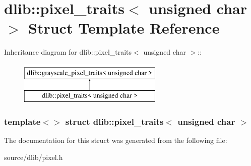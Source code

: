 \hypertarget{structdlib_1_1pixel__traits_3_01unsigned_01char_01_4}{
\section{dlib::pixel\_\-traits$<$ unsigned char $>$ Struct Template Reference}
\label{structdlib_1_1pixel__traits_3_01unsigned_01char_01_4}
}
Inheritance diagram for dlib::pixel\_\-traits$<$ unsigned char $>$::\begin{figure}[H]
\begin{center}
\leavevmode
\includegraphics[height=2cm]{structdlib_1_1pixel__traits_3_01unsigned_01char_01_4}
\end{center}
\end{figure}
\subsubsection*{template$<$$>$ struct dlib::pixel\_\-traits$<$ unsigned char $>$}



The documentation for this struct was generated from the following file:\begin{DoxyCompactItemize}
\item 
source/dlib/pixel.h\end{DoxyCompactItemize}
